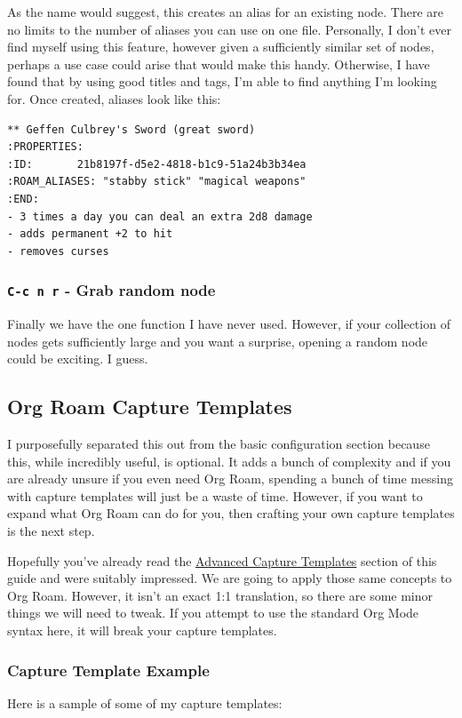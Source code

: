 \documentclass[11pt]{article}
\begin{document}
As the name would suggest, this creates an alias for an existing node. There are no limits to the number of aliases you can use on one file. Personally, I don't ever find myself using this feature, however given a sufficiently similar set of nodes, perhaps a use case could arise that would make this handy. Otherwise, I have found that by using good titles and tags, I'm able to find anything I'm looking for. Once created, aliases look like this:

\begin{verbatim}
** Geffen Culbrey's Sword (great sword)
:PROPERTIES:
:ID:       21b8197f-d5e2-4818-b1c9-51a24b3b34ea
:ROAM_ALIASES: "stabby stick" "magical weapons"
:END:
- 3 times a day you can deal an extra 2d8 damage
- adds permanent +2 to hit
- removes curses
\end{verbatim}
\subsubsection*{\texttt{C-c n r} - Grab random node}
\label{sec:orgcac11ee}

Finally we have the one function I have never used. However, if your collection of nodes gets sufficiently large and you want a surprise, opening a random node could be exciting. I guess.
\subsection*{Org Roam Capture Templates}
\label{sec:org684dfc9}
I purposefully separated this out from the basic configuration section because this, while incredibly useful, is optional. It adds a bunch of complexity and if you are already unsure if you even need Org Roam, spending a bunch of time messing with capture templates will just be a waste of time. However, if you want to expand what Org Roam can do for you, then crafting your own capture templates is the next step.

Hopefully you've already read the \hyperref[sec:org118b065]{Advanced Capture Templates} section of this guide and were suitably impressed. We are going to apply those same concepts to Org Roam. However, it isn't an exact 1:1 translation, so there are some minor things we will need to tweak. If you attempt to use the standard Org Mode syntax here, it will break your capture templates.
\subsubsection*{Capture Template Example}
\label{sec:orgdbcf7f5}
Here is a sample of some of my capture templates:
\end{document}
